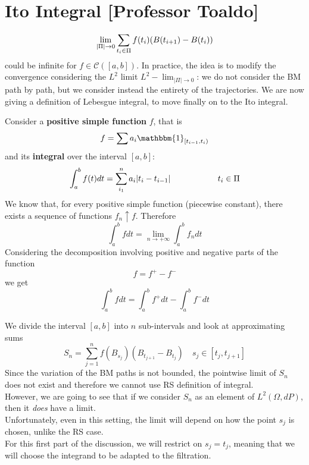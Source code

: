 \chapter{Ito Integral [Professor Toaldo]}
\begin{equation*}
    \lim_{|\Pi| \rightarrow 0} \sum_{t_i \in \Pi}f(t_i) (B(t_{i+1})-B(t_i))
    \end{equation*}
could be infinite for $f \in \mathcal{C}([a,b])$. In practice, the idea is to modify the convergence considering the $L^2$ limit $L^2 - \lim_{|\Pi| \rightarrow 0}$: we do not consider the BM path by path, but we consider instead the entirety of the trajectories. We are now giving a definition of Lebesgue integral, to move finally on to the Ito integral.
\begin{DefBox}
    \begin{Def}
    Consider a \textbf{positive simple function} $f$, that is 
    \begin{equation*}
        f = \sum a_i \mathbbm{1}_{[t_{i-1}, t_i)}
    \end{equation*}
and its \textbf{integral} over the interval $[a,b]$:
    \begin{equation*}
        \int_a^b f(t)dt=\sum_{i_1}^n a_i|t_i -t_{i-1}| \hspace{2 cm} t_i \in \Pi
    \end{equation*}
    We know that, for every positive simple function (piecewise constant), there exists a sequence of functions $f_n \uparrow f$. Therefore
    \begin{equation*}
        \int_a^b f dt  = \lim_{n \rightarrow +\infty}\int_a^b f_n dt
    \end{equation*}
    Considering the decomposition involving positive and negative parts of the function
    \begin{equation*}
        f = f^+ - f^-
    \end{equation*}
    we get 
    \begin{equation*}
        \int_a^b f dt = \int_a^b f^+ dt - \int_a^b f^- dt 
    \end{equation*}
\end{Def}
\end{DefBox}
We divide the interval $[a,b]$ into $n$ sub-intervals and look at approximating sums
\begin{equation*}
    S_n = \sum_{j = 1}^n f(B_{s_j}) (B_{t_{j+1}} - B_{t_j}) \quad s_j \in [t_j, t_{j+1}]
\end{equation*}
Since the variation of the BM paths is not bounded, the pointwise limit of $S_n$ does not exist and therefore we cannot use RS definition of integral. \\
However, we are going to see that if we consider $S_n$ as an element of $L^2(\Omega, dP)$, then it \emph{does} have a limit. \\
Unfortunately, even in this setting, the limit will depend on how the point $s_j$ is chosen, unlike the RS case. \\
For this first part of the discussion, we will restrict on $s_j = t_j$, meaning that we will choose the integrand to be adapted to the filtration. 

